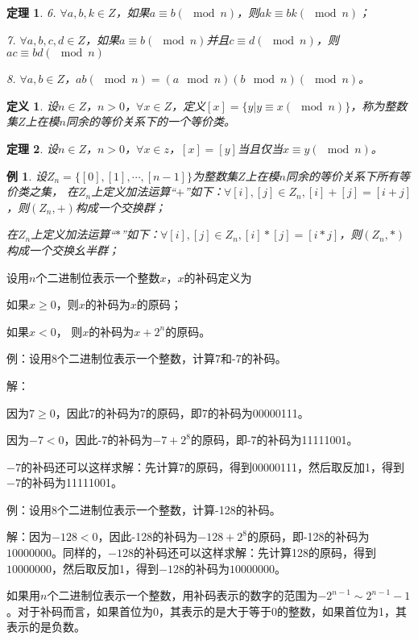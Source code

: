 \documentclass{article}
\newtheorem{Def}{定义}
\newtheorem{Thm}{定理}
\newtheorem*{Example}{例}
\begin{document}
\begin{CJK*}{UTF8}{gbsn}
\begin{Thm}
  6. $\forall a,b,k\in Z$，如果$a\equiv b(\mod n)$，则$ak\equiv bk(\mod n)$；

  7. $\forall a,b,c,d\in Z$，如果$a\equiv b(\mod n)$并且$c\equiv d(\mod n)$，则$ac\equiv bd (\mod n)$

  8. $\forall a,b\in Z$，$ab (\mod n)=(a\mod n)(b\mod n) (\mod n)$。
\end{Thm}

\begin{Def}
  设$n\in Z$，$n>0$，$\forall x\in Z$，定义$[x]=\{y|y\equiv x (\mod n)\}$，称为整数集$Z$上在模$n$同余的等价关系下的一个等价类。
\end{Def}
\begin{Thm}
  设$n\in Z$，$n>0$，$\forall x\in z$，$[x]=[y]$当且仅当$x\equiv y(\mod n)$。
\end{Thm}

\begin{Example}
  设$Z_n=\{[0],[1],\cdots,[n-1]\}$为整数集$Z$上在模$n$同余的等价关系下所有等价类之集，
  在$Z_n$上定义加法运算“$+$”如下：$\forall [i],[j]\in Z_n,[i]+[j]=[i+j]$，则$(Z_n,+)$构成一个交换群；

  在$Z_n$上定义加法运算“$*$”如下：$\forall [i],[j]\in Z_n,[i]*[j]=[i*j]$，则$(Z_n,*)$构成一个交换幺半群；
\end{Example}


设用$n$个二进制位表示一个整数$x$，$x$的补码定义为

如果$x\geq 0$，则$x$的补码为$x$的原码；

如果$x < 0$， 则$x$的补码为$x+2^n$的原码。

例：设用8个二进制位表示一个整数，计算7和-7的补码。

解：

因为$7\geq 0$，因此7的补码为7的原码，即7的补码为00000111。

因为$-7 < 0$，因此-7的补码为$-7+2^8$的原码，即-7的补码为11111001。

$-7$的补码还可以这样求解：先计算7的原码，得到00000111，然后取反加1，得到$-7$的补码为11111001。

例：设用8个二进制位表示一个整数，计算-128的补码。

解：因为$-128 < 0$，因此-128的补码为$-128+2^8$的原码，即-128的补码为$10000000$。同样的，$-128$的补码还可以这样求解：先计算128的原码，得到$10000000$，然后取反加1，得到$-128$的补码为$10000000$。

如果用$n$个二进制位表示一个整数，用补码表示的数字的范围为$-2^{n-1}\sim 2^{n-1}-1$。对于补码而言，如果首位为0，其表示的是大于等于0的整数，如果首位为1，其表示的是负数。


\end{CJK*}
\end{document}

